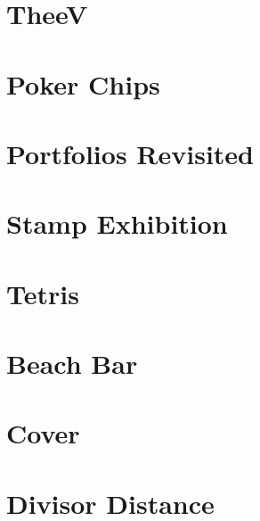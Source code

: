 \documentclass[a4paper, 10pt]{article}
\let\stdsection\section
\renewcommand\section{\newpage\stdsection}
\newcommand{\includecode}[1]{
    }
\newcommand{\algoAuthor}{2} %
\begin{document}
    \section{TheeV}
        \label{sec:theev}
        \includecode{../problems/w09/TheeV/TheeV\algoAuthor.cpp}
   
    
    \section{Poker Chips}
        \label{sec:poker_chips}
        \includecode{../problems/w10/Poker_Chips/PokerChips\algoAuthor.cpp}
        
    \section{Portfolios Revisited}
        \label{sec:portfolios_revisited}
        \includecode{../problems/w10/Portfolios_Revisited/PortfolioRevisited\algoAuthor.cpp}
        
    \section{Stamp Exhibition}
        \label{sec:stamp_exhibition}
        \includecode{../problems/w10/Stamp_Exhibition/StampExhibition\algoAuthor.cpp}
        
    \section{Tetris}
        \label{sec:tetris}
        \includecode{../problems/w10/Tetris/Tetris\algoAuthor.cpp}
 
    
    \section{Beach Bar}
        \label{sec:beach_bar}
        \includecode{../problems/w11/Beach_Bar/BeachBar\algoAuthor.cpp}
        
    \section{Cover}
        \label{sec:cover}
        \includecode{../problems/w11/Cover/Cover\algoAuthor.cpp}
        
    \section{Divisor Distance}
        \label{sec:divisor_distance}
        \includecode{../problems/w11/Divisor_Distance/DivisorDistance\algoAuthor.cpp}
        
\end{document}
